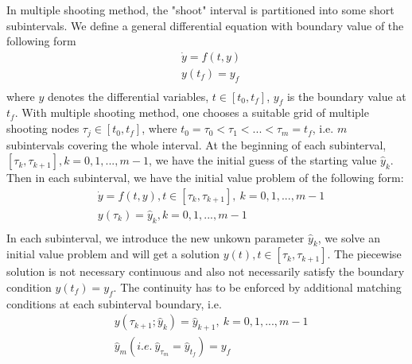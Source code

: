 \documentclass  [
  paper    = a4,
  BCOR     = 10mm,
  twoside,
  fontsize = 12pt,
  fleqn,
  toc      = bibnumbered,
  toc      = listofnumbered,
  numbers  = noendperiod,
  headings = normal,
  listof   = leveldown,
  version  = 3.03
]                                       {scrreprt}
\newcommand{\<}{\langle}
\renewcommand{\>}{\rangle}
\begin{document}
In multiple shooting method, the "shoot" interval is partitioned into some short subintervals. We define a general differential equation with boundary value of the following form
\begin{equation}\label{eqn:ori_dae}
	\begin{aligned}
		& \dot{y} = f(t, y) \\ 
		& y(t_f) = y_f  \\
	\end{aligned}
\end{equation}
where $y$ denotes the differential variables, $t \in [t_0, t_f]$,  $y_f$ is the boundary value at $t_f$.  With multiple shooting method, one chooses a suitable grid of multiple shooting nodes $\tau_j \in [t_0,t_f] $, where $t_0 = \tau_0 < \tau_1 < ... < \tau_m = t_f$,  i.e. $m$ subintervals covering the whole interval. At the beginning of each subinterval, $[\tau_k, \tau_{k+1}], k = 0, 1, ..., m-1$, we have the initial guess of the starting value $\hat{y}_k$. Then in each subinterval, we have the initial value problem of the following form: 
\begin{equation}\label{eqn:msh}
	\begin{aligned}
		& \dot{y} = f(t, y) , t \in [\tau_k, \tau_{k+1}], \ k = 0, 1, ..., m-1   \\ 
		& y(\tau_k) = \hat{y}_k, k = 0, 1, ..., m-1  \\
	\end{aligned}
\end{equation}
In each subinterval, we introduce the new unkown parameter $\hat{y}_k$, we solve an initial value problem and will get a solution $y(t), t \in [\tau_k, \tau_{k+1}]$. The piecewise solution is not necessary continuous and also not necessarily satisfy the boundary condition $y(t_f) = y_f$. The continuity has to be enforced by additional matching conditions at each subinterval boundary, i.e. 
\begin{equation}\label{eqn:mc}
	\begin{aligned}
		& y(\tau_{k+1}; \hat{y}_k) = \hat{y}_{k+1}, \  k = 0, 1, ..., m-1  \\
		& \hat{y}_{m} (i.e. \ \hat{y}_{\tau_m} = \hat{y}_{t_f}) =  y_f 
	\end{aligned}
\end{equation}
\end{document}
